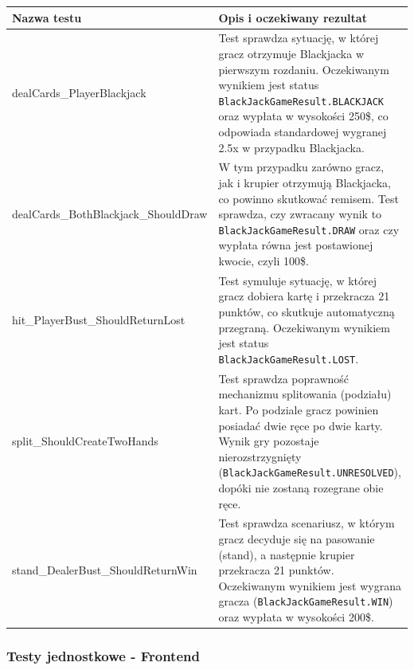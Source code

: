 \documentclass[a4paper,12pt]{article}
\begin{document}
\begin{tabularx}{\textwidth}{lX}
\toprule
\textbf{Nazwa testu} & \textbf{Opis i oczekiwany rezultat} \\
\midrule
dealCards\_PlayerBlackjack & Test sprawdza sytuację, w której gracz otrzymuje Blackjacka w pierwszym rozdaniu. Oczekiwanym wynikiem jest status \texttt{BlackJackGameResult.BLACKJACK} oraz wypłata w wysokości 250\$, co odpowiada standardowej wygranej 2.5x w przypadku Blackjacka. \\
dealCards\_BothBlackjack\_ShouldDraw & W tym przypadku zarówno gracz, jak i krupier otrzymują Blackjacka, co powinno skutkować remisem. Test sprawdza, czy zwracany wynik to \texttt{BlackJackGameResult.DRAW} oraz czy wypłata równa jest postawionej kwocie, czyli 100\$. \\
hit\_PlayerBust\_ShouldReturnLost & Test symuluje sytuację, w której gracz dobiera kartę i przekracza 21 punktów, co skutkuje automatyczną przegraną. Oczekiwanym wynikiem jest status \texttt{BlackJackGameResult.LOST}. \\
split\_ShouldCreateTwoHands & Test sprawdza poprawność mechanizmu splitowania (podziału) kart. Po podziale gracz powinien posiadać dwie ręce po dwie karty. Wynik gry pozostaje nierozstrzygnięty (\texttt{BlackJackGameResult.UNRESOLVED}), dopóki nie zostaną rozegrane obie ręce. \\
stand\_DealerBust\_ShouldReturnWin & Test sprawdza scenariusz, w którym gracz decyduje się na pasowanie (stand), a następnie krupier przekracza 21 punktów. Oczekiwanym wynikiem jest wygrana gracza (\texttt{BlackJackGameResult.WIN}) oraz wypłata w wysokości 200\$. \\
\bottomrule
\end{tabularx}

\subsubsection*{Testy jednostkowe - Frontend}
\end{document}
